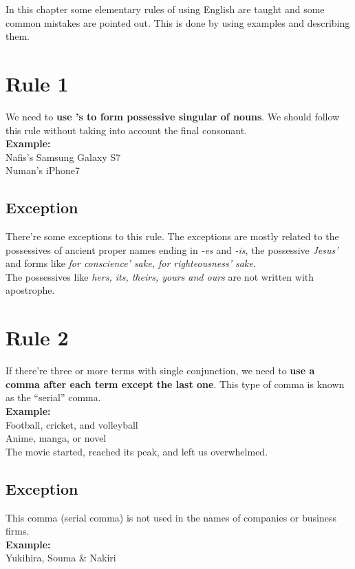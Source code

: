 \documentclass[12pt]{report}
\begin{document}
\raggedright
In this chapter some elementary rules of using English are taught and some common mistakes are pointed out. This is done by using examples and describing them.

\section{Rule 1}
We need to \textbf{use 's to form possessive singular of nouns}. We should follow this rule without taking into account the final consonant.\\
\textbf{Example:}\\
Nafis's Samsung Galaxy S7\\
Numan's iPhone7\\

\subsection{Exception}
There're some exceptions to this rule. The exceptions are mostly related to the possessives of ancient proper names ending in \textit{-es} and \textit{-is}, the possessive \textit{Jesus'} and forms like \textit{for conscience' sake, for righteousness' sake}.\\
The possessives like \textit{hers, its, theirs, yours \emph{and} ours} are not written with apostrophe.


\section{Rule 2}
If there're three or more terms with single conjunction, we need to \textbf{use a comma after each term except the last one}. This type of comma is known as the ``serial'' comma.\\
\textbf{Example:}\\
Football, cricket, and volleyball\\
Anime, manga, or novel\\
The movie started, reached its peak, and left us overwhelmed.\\

\subsection{Exception}
This comma (serial comma) is not used in the names of companies or business firms.\\ \textbf{Example:}\\ 
Yukihira, Souma \& Nakiri
\end{document}
